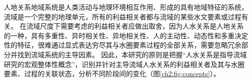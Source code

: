 



人地关系地域系统是人类活动与地理环境相互作用、形成的具有地域特征的系统\cite{tan2021}，流域是一个完整的地理单元，所有的利益相关者都与流域的某些水文要素或过程有关。
在流域尺度下需要考虑的利益相关者应做出取舍，因为人\textendash{}水关系是人地关系的一种，具有多重性、异时相关性、异地相关性、人的主动性、动态性和多重决定性的特征\cite{fang2004}，很难通过显式表达穷尽其与水圈要素过程的全部关系，需要忽略冗余部分并找到流域系统的主导因素。
因此，本研究的原则是把握“人\textendash{}水关系是指导流域研究的宏观整体性概念”，识别并针对主导流域人\textendash{}水关系的利益相关者及其与水圈要素、过程的关联状态，分析不同阶段间的变化（图\ref{ch2:fig:concepts}）。

